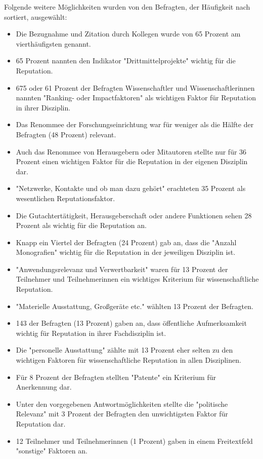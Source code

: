 Folgende weitere Möglichkeiten wurden von den Befragten, der Häufigkeit nach sortiert, ausgewählt:
\begin{itemize}
\item Die Bezugnahme und Zitation durch Kollegen wurde von 65 Prozent am vierthäufigsten genannt.
\item 65 Prozent nannten den Indikator "Drittmittelprojekte" wichtig für die Reputation.
\item 675 oder 61 Prozent der Befragten Wissenschaftler und Wissenschaftlerinnen nannten "Ranking- oder Impactfaktoren" als wichtigen Faktor für Reputation in ihrer Disziplin.
\item Das Renommee der Forschungseinrichtung war für weniger als die Hälfte der Befragten (48 Prozent) relevant.
\item Auch das Renommee von Herausgebern oder Mitautoren stellte nur für 36 Prozent einen wichtigen Faktor für die Reputation in der eigenen Disziplin dar.
\item "Netzwerke, Kontakte und ob man dazu gehört" erachteten 35 Prozent als wesentlichen Reputationsfaktor.
\item Die Gutachtertätigkeit, Herausgeberschaft oder andere Funktionen sehen 28 Prozent als wichtig für die Reputation an.
\item Knapp ein Viertel der Befragten (24 Prozent) gab an, dass die "Anzahl Monografien" wichtig für die Reputation in der jeweiligen Disziplin ist.
\item "Anwendungsrelevanz und Verwertbarkeit" waren für 13 Prozent der Teilnehmer und Teilnehmerinnen ein wichtiges Kriterium für wissenschaftliche Reputation.
\item "Materielle Ausstattung, Großgeräte etc." wählten 13 Prozent der Befragten.
\item 143 der Befragten (13 Prozent) gaben an, dass öffentliche Aufmerksamkeit wichtig für Reputation in ihrer Fachdisziplin ist.
\item Die "personelle Ausstattung" zählte mit 13 Prozent eher selten zu den wichtigen Faktoren für wissenschaftliche Reputation in allen Disziplinen.
\item Für 8 Prozent der Befragten stellten "Patente" ein Kriterium für Anerkennung dar.
\item Unter den vorgegebenen Antwortmöglichkeiten stellte die "politische Relevanz" mit 3 Prozent der Befragten den unwichtigsten Faktor für Reputation dar.
\item 12 Teilnehmer und Teilnehmerinnen (1 Prozent) gaben in einem Freitextfeld "sonstige" Faktoren an.
\end{itemize}

